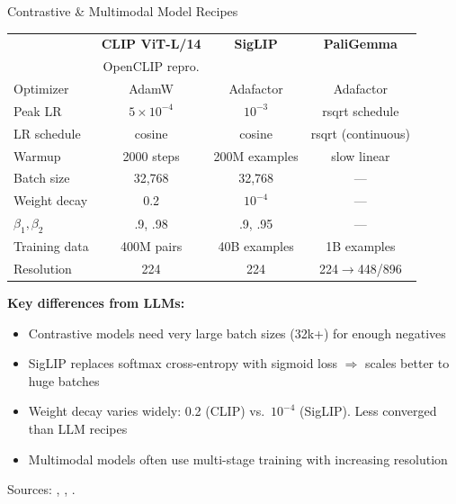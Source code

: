 \begin{frame}{Contrastive \& Multimodal Model Recipes}

  \begin{center}
    \renewcommand{\arraystretch}{1.15}
    \begin{tabular}{lccc}
      \toprule
      & \textbf{CLIP ViT-L/14} & \textbf{SigLIP} & \textbf{PaliGemma} \\
      & \scriptsize OpenCLIP repro. & & \\
      \midrule
      Optimizer & AdamW & Adafactor & Adafactor \\
      Peak LR & $5 \times 10^{-4}$ & $10^{-3}$ & rsqrt schedule \\
      LR schedule & cosine & cosine & rsqrt (continuous) \\
      Warmup & 2000 steps & 200M examples & slow linear \\
      Batch size & 32,768 & 32,768 & --- \\
      Weight decay & 0.2 & $10^{-4}$ & --- \\
      $\beta_1, \beta_2$ & .9, .98 & .9, .95 & --- \\
      Training data & 400M pairs & 40B examples & 1B examples \\
      Resolution & 224 & 224 & 224$\to$448/896 \\
      \bottomrule
    \end{tabular}
  \end{center}

  \vspace{0.3em}
  {\small \textbf{Key differences from LLMs:}
  \begin{itemize}
    \item Contrastive models need very large batch sizes (32k+) for enough negatives
    \item SigLIP replaces softmax cross-entropy with sigmoid loss $\Rightarrow$ scales better to huge batches
    \item Weight decay varies widely: 0.2 (CLIP) vs.\ $10^{-4}$ (SigLIP). Less converged than LLM recipes
    \item Multimodal models often use multi-stage training with increasing resolution
  \end{itemize}
  }

  {\scriptsize Sources: \cite{radford2021clip}, \cite{zhai2023siglip}, \cite{beyer2024paligemma}.}
\end{frame}


